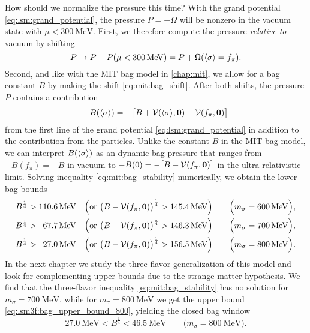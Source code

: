 How should we normalize the pressure this time?
With the grand potential \eqref{eq:lsm:grand_potential},
the pressure $P = - \Omega$ will be nonzero in the vacuum state with $\mu < \SI{300}{\mega\electronvolt}$.
First, we therefore compute the pressure \emph{relative to} vacuum by shifting
\begin{equation}
	P \rightarrow P - P(\mu < \SI{300}{\mega\electronvolt}) = P + \Omega(\langle \sigma \rangle=f_\pi) .
\label{eq:lsm:pressure_bagless}
\end{equation}
Second, and like with the MIT bag model in \cref{chap:mit},
we allow for a bag constant $B$ by making the shift \eqref{eq:mit:bag_shift}.
After both shifts, the pressure $P$ contains a contribution
\begin{equation}
	-B(\langle \sigma \rangle) = -\big[B+\mathcal{V}(\langle \sigma \rangle,{\bm{0}})-\mathcal{V}(f_\pi,{\bm{0}})\big]
\label{eq:lsm:bag_pressure}
\end{equation}
from the first line of the grand potential \eqref{eq:lsm:grand_potential} in addition to the contribution from the particles.
Unlike the constant $B$ in the MIT bag model,
we can interpret $B(\langle \sigma \rangle)$ as an dynamic bag pressure that ranges from $-B(f_\pi)=-B$ in vacuum to $-B(0) = -\big[B-\mathcal{V}(f_\pi,{\bm{0}})\big]$ in the ultra-relativistic limit.
Solving inequality \eqref{eq:mit:bag_stability} numerically, we obtain the lower bag bounds
\begin{subequations}
\begin{align}
	B^\frac14 > \SI{110.6}{\mega\electronvolt}           \quad \Big(\text{or } \big(B-\mathcal{V}(f_\pi,{\bm{0}})\big)^\frac14 > \SI{145.4}{\mega\electronvolt}\Big) \qquad \Big(m_\sigma = \SI{600}{\mega\electronvolt}\Big), \label{eq:lsm:bag_lower_bound_600} \\
	B^\frac14 > \phantom{0}\SI{67.7}{\mega\electronvolt} \quad \Big(\text{or } \big(B-\mathcal{V}(f_\pi,{\bm{0}})\big)^\frac14 > \SI{146.3}{\mega\electronvolt}\Big) \qquad \Big(m_\sigma = \SI{700}{\mega\electronvolt}\Big), \label{eq:lsm:bag_lower_bound_700} \\
	B^\frac14 > \phantom{0}\SI{27.0}{\mega\electronvolt} \quad \Big(\text{or } \big(B-\mathcal{V}(f_\pi,{\bm{0}})\big)^\frac14 > \SI{156.5}{\mega\electronvolt}\Big) \qquad \Big(m_\sigma = \SI{800}{\mega\electronvolt}\Big). \label{eq:lsm:bag_lower_bound_800}
\end{align}%
\label{eq:lsm:bag_lower_bound}%
\end{subequations}%
In the next chapter we study the three-flavor generalization of this model and look for complementing upper bounds due to the strange matter hypothesis.
We find that the three-flavor inequality \eqref{eq:mit:bag_stability} has no solution for $m_\sigma=\SI{700}{\mega\electronvolt}$,
while for $m_\sigma=\SI{800}{\mega\electronvolt}$ we get the upper bound \eqref{eq:lsm3f:bag_upper_bound_800},
yielding the closed bag window
\begin{equation}
	\SI{27.0}{\mega\electronvolt} < B^\frac14 < \SI{46.5}{\mega\electronvolt} \qquad \big(m_\sigma = \SI{800}{\mega\electronvolt}\big).
\label{eq:lsm:bag_window_800}
\end{equation}

